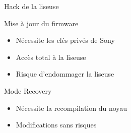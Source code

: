 \begin{frame}{Hack de la liseuse}
	\begin{block}{Mise à jour du firmware}
		\begin{itemize}
			\item Nécessite les clés privés de Sony
			\item Accès total à la liseuse
			\item Risque d'endommager la liseuse
		\end{itemize}
	\end{block}
	\begin{block}{Mode Recovery}
		\begin{itemize}
			\item Nécessite la recompilation du noyau
			\item Modifications sans risques
		\end{itemize}
	\end{block}
\end{frame}
